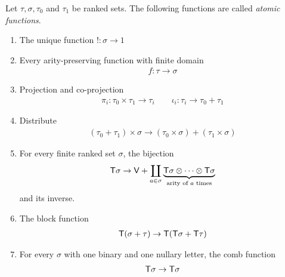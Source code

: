 \begin{definition}\label{def:atomic-functions}
    Let $\tau,\sigma,\tau_0$ and $\tau_1$ be ranked sets. The following functions are called \emph{atomic functions}. 
\begin{enumerate}
    \item The unique  function $! : \sigma \to 1$
    \item Every arity-preserving function with finite domain
    \begin{align*}
        f : \tau \to \sigma
    \end{align*}
    \item Projection and co-projection
    \begin{align*}
        \pi_i : \tau_0 \times \tau_1 \to \tau_i \qquad \iota_i : \tau_i \to \tau_0 + \tau_1
    \end{align*}
    \item Distribute
\begin{align*}
    (\tau_0 + \tau_1 ) \times \sigma \to (\tau_0 \times \sigma) + (\tau_1 \times \sigma)
\end{align*}
\item For every finite ranked set $\sigma$, the bijection 
 \begin{align*}
    \mathsf T \sigma  \to  \mathsf V + \coprod_{a \in \sigma} \underbrace{\mathsf T \sigma \otimes \cdots \otimes \mathsf T \sigma}_{\text{arity of $a$ times}}
\end{align*}
and its inverse.


\item The block function
    \begin{align*}
        \mathsf T (\sigma + \tau) \to \mathsf T (\mathsf T \sigma + \mathsf T \tau)
    \end{align*}
    \item For every $\sigma$ with one binary and one nullary letter, the comb function 
    \begin{align*}
        \mathsf T \sigma \to \mathsf T \sigma
    \end{align*}
    

\end{enumerate}
\end{definition}
